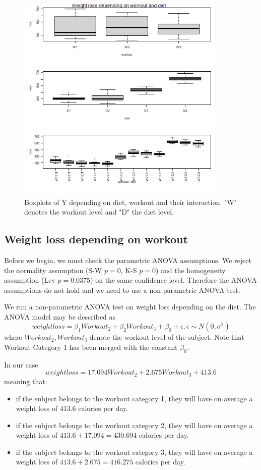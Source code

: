 \documentclass[12pt, a4paper]{article}
\begin{document}
	\begin{figure}
		\includegraphics[width=10cm]{boxplot_2.png}
		\centering
		\caption{Boxplots of Y depending on diet, workout and their interaction. "W" denotes the workout level and "D" the diet level.}
		\label{fig::boxplot_2}
	\end{figure}
	
	
	\subsection{Weight loss depending on workout}
	
	Before we begin, we must check the parametric ANOVA assumptions. We reject the normality assumption (S-W $p=0$, K-S $p=0$) and the homogeneity assumption (Lev $p=0.0375$) on the same confidence level. Therefore the ANOVA assumptions do not hold and we need to use a non-parametric ANOVA test.

	We run a non-parametric ANOVA test on weight loss depending on the diet. The ANOVA model may be described as $$
	weightloss = \beta_1 Workout_2 + \beta_2 Workout_3 + \beta_0 + \epsilon, \epsilon \sim N(0, \sigma^2)
	$$
	where $Workout_2, Workout_3$ denote the workout level of the subject. Note that Workout Category 1 has been merged with the constant $\beta_0$.
	
	In our case
	$$
	weightloss = 17.094 Workout_2 + 2.675 Workout_3 + 413.6
	$$
	meaning that:
	
	\begin{itemize}
		\item if the subject belongs to the workout category 1, they will have on average a weight loss of $413.6$ calories per day.
		
		\item if the subject belongs to the workout category 2, they will have on average a weight loss of $413.6 + 17.094 = 430.694$ calories per day.
		
		\item if the subject belongs to the workout category 3, they will have on average a weight loss of $413.6 + 2.675 = 416.275$ calories per day.
	\end{itemize}
	
\end{document}
